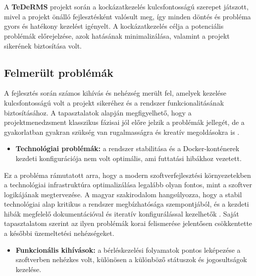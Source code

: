 \chapter{\riskproblem}

A \textbf{TeDeRMS} projekt során a kockázatkezelés kulcsfontosságú szerepet játszott, 
mivel a projekt önálló fejlesztésként valósult meg, így minden döntés és probléma gyors és hatékony kezelést igényelt. 
A kockázatkezelés célja a potenciális problémák előrejelzése, azok hatásának minimalizálása, 
valamint a projekt sikerének biztosítása volt.

\section{Felmerült problémák}

A fejlesztés során számos kihívás és nehézség merült fel, amelyek kezelése kulcsfontosságú volt a 
projekt sikeréhez és a rendszer funkcionalitásának biztosításához. 
A tapasztalatok alapján megfigyelhető, hogy a projektmenedzsment klasszikus fázisai jól előre jelzik a 
problémák jellegét, de a gyakorlatban gyakran szükség van rugalmasságra és kreatív megoldásokra is \cite{Hajdu2014,Szalay2018}.

\begin{itemize}
    \item \textbf{Technológiai problémák:} a rendszer stabilitása és a Docker-konténerek kezdeti konfigurációja nem volt optimális, ami futtatási hibákhoz vezetett.
\end{itemize}

Ez a probléma rámutatott arra, hogy a modern szoftverfejlesztési környezetekben a technológiai infrastruktúra 
optimalizálása legalább olyan fontos, mint a szoftver logikájának megtervezése. 
A magyar szakirodalom hangsúlyozza, hogy a stabil technológiai alap kritikus a rendszer megbízhatósága szempontjából, 
és a kezdeti hibák megfelelő dokumentációval és iteratív konfigurálással kezelhetők \cite{Kovacs2016,Kaposi2019}. 
Saját tapasztalatom szerint az ilyen problémák korai felismerése jelentősen csökkentette a későbbi üzemeltetési nehézségeket.

\begin{itemize}
    \item \textbf{Funkcionális kihívások:} a bérléskezelési folyamatok pontos leképezése a szoftverben nehézkes volt, különösen a különböző státuszok és jogosultságok kezelése.
\end{itemize}


